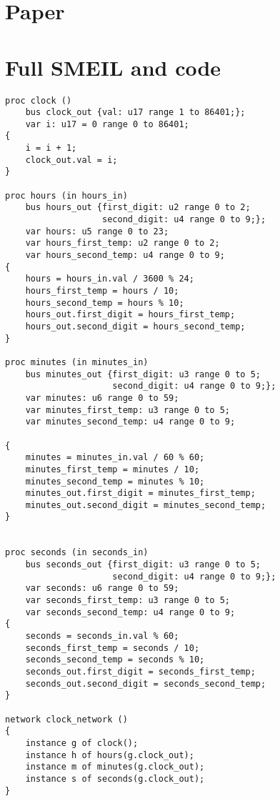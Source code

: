 \section*{Paper}
\section*{Full SMEIL and \cspm code}
\begin{verbatim}
proc clock ()
    bus clock_out {val: u17 range 1 to 86401;};
    var i: u17 = 0 range 0 to 86401;
{
    i = i + 1;
    clock_out.val = i;
}

proc hours (in hours_in)
    bus hours_out {first_digit: u2 range 0 to 2;
                   second_digit: u4 range 0 to 9;};
    var hours: u5 range 0 to 23;
    var hours_first_temp: u2 range 0 to 2;
    var hours_second_temp: u4 range 0 to 9;
{
    hours = hours_in.val / 3600 % 24;
    hours_first_temp = hours / 10;
    hours_second_temp = hours % 10;
    hours_out.first_digit = hours_first_temp;
    hours_out.second_digit = hours_second_temp;
}

proc minutes (in minutes_in)
    bus minutes_out {first_digit: u3 range 0 to 5;
                     second_digit: u4 range 0 to 9;};
    var minutes: u6 range 0 to 59;
    var minutes_first_temp: u3 range 0 to 5;
    var minutes_second_temp: u4 range 0 to 9;

{
    minutes = minutes_in.val / 60 % 60;
    minutes_first_temp = minutes / 10;
    minutes_second_temp = minutes % 10;
    minutes_out.first_digit = minutes_first_temp;
    minutes_out.second_digit = minutes_second_temp;
}


proc seconds (in seconds_in)
    bus seconds_out {first_digit: u3 range 0 to 5;
                     second_digit: u4 range 0 to 9;};
    var seconds: u6 range 0 to 59;
    var seconds_first_temp: u3 range 0 to 5;
    var seconds_second_temp: u4 range 0 to 9;
{
    seconds = seconds_in.val % 60;
    seconds_first_temp = seconds / 10;
    seconds_second_temp = seconds % 10;
    seconds_out.first_digit = seconds_first_temp;
    seconds_out.second_digit = seconds_second_temp;
}

network clock_network ()
{
    instance g of clock();
    instance h of hours(g.clock_out);
    instance m of minutes(g.clock_out);
    instance s of seconds(g.clock_out);
}

\end{verbatim}

